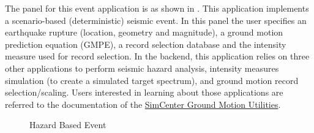 The panel for this event application is as shown in
. This application implements a scenario-based
(deterministic) seismic event.  In this panel the user specifies an
earthquake rupture (location, geometry and magnitude), a ground motion
prediction equation (GMPE), a record selection database and the intensity
measure used for record selection. In the backend, this application
relies on three other applications to perform seismic hazard analysis,
intensity measures simulation (to create a simulated target spectrum),
and ground motion record selection/scaling. Users interested in
learning about those applications are referred to the documentation of
the
\href{https://github.com/NHERI-SimCenter/GroundMotionUtilities/blob/master/Readme.md}{SimCenter
  Ground Motion Utilities}.

\begin{figure}[!htbp]
  \caption{Hazard Based Event}
  \label{fig:hazard_based_event_panel}
\end{figure}

